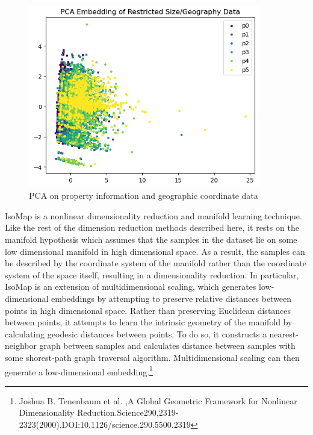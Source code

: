 \documentclass[12pt]{article}
\newtheorem{Proof of Lemma}{Proof of Lemma}
\begin{document}
\begin{figure}[H]
	\begin{center}
		\includegraphics*[width=0.9\textwidth]{../figures/pca_restricted_geo.png}
		\caption*{PCA on property information and geographic coordinate data}
	\end{center}
\end{figure}

IsoMap is a nonlinear dimensionality reduction and manifold learning technique. Like the rest of the dimension reduction methods described here, it rests on the manifold hypothesis which assumes that the samples in the dataset lie on some low dimensional manifold in high dimensional space. As a result, the samples can be described by the coordinate system of the manifold rather than the coordinate system of the space itself, resulting in a dimensionality reduction. In particular, IsoMap is an extension of multidimensional scaling, which generates low-dimensional embeddings by attempting to preserve relative distances between points in high dimensional space. Rather than preserving Euclidean distances between points, it attempts to learn the intrinsic geometry of the manifold by calculating geodesic distances between points. To do so, it constructs a nearest-neighbor graph between samples and calculates distance between samples with some shorest-path graph traversal algorithm. Multidimensional scaling  can then generate a low-dimensional embedding.\footnote{Joshua B. Tenenbaum et al. ,A Global Geometric Framework for Nonlinear Dimensionality Reduction.Science290,2319-2323(2000).DOI:10.1126/science.290.5500.2319} \\
\end{document}
